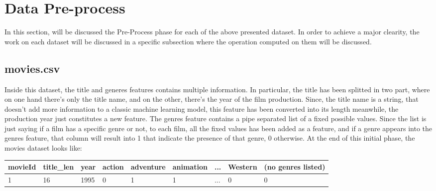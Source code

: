 \documentclass[../main]{subfiles}
\begin{document}
\section{Data Pre-process}
In this section, will be discussed the Pre-Process phase for each of the above presented dataset.
In order to achieve a major clearity, the work on each dataset will be discussed in a specific subsection where the operation computed on them will be discussed.
\subsection{movies.csv}
Inside this dataset, the title and generes features contains multiple information. In particular, the title has been splitted in two part, where on one hand there's only the title name, and on the other, there's the year of the film production.
Since, the title name is a string, that doesn't add more information to a classic machine learning model, this feature has been converted into its length meanwhile, the production year just constitutes a new feature.
The genres feature contains a pipe separated list of a fixed possible values. Since the list is just saying if a film has a specific genre or not, to each film, all the fixed values has been added as a feature, and if a genre appears into the genres feature, that column will result into 1 that indicate the presence of that genre, 0 otherwise. At the end of this initial phase, the movies dataset looks like:
\begin{table}[h]
    \begin{tabular}{|l|l|l|l|l|l|l|l|l|}
    \hline
    \textbf{movieId} & \textbf{title\_len} & \textbf{year} & \textbf{action} & \textbf{adventure} & \textbf{animation} & \textbf{...}  & \textbf{Western} & \textbf{(no genres listed)} \\ \hline
    1                & 16                  & 1995          & 0               & 1                  & 1                  & ...           & 0                & 0                           \\ \hline
    \end{tabular}
\end{table}
\end{document}

